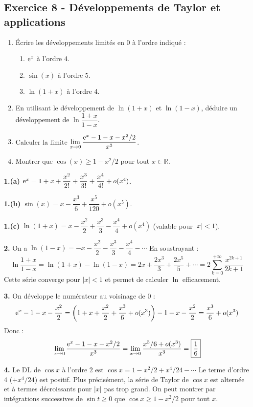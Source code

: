 \documentclass[12pt,a4paper]{article}
\begin{document}
\subsection*{Exercice 8 - Développements de Taylor et applications \niveau{\moyen}}

\begin{boiteexercice}
\begin{enumerate}
  \item Écrire les développements limités en 0 à l'ordre indiqué :
  \begin{enumerate}[label=(\alph*)]
    \item $\mathrm{e}^x$ à l'ordre 4.
    \item $\sin(x)$ à l'ordre 5.
    \item $\ln(1+x)$ à l'ordre 4.
  \end{enumerate}
  \item En utilisant le développement de $\ln(1+x)$ et $\ln(1-x)$, déduire un développement de $\ln\dfrac{1+x}{1-x}$.
  \item Calculer la limite $\displaystyle\lim_{x\to0}\frac{\mathrm{e}^x - 1 - x - x^2/2}{x^3}$.
  \item Montrer que $\cos(x) \geq 1 - x^2/2$ pour tout $x\in\mathbb{R}$.
\end{enumerate}
\end{boiteexercice}

\begin{boitecorrige}
\textbf{1.(a)} $\mathrm{e}^x = 1 + x + \dfrac{x^2}{2!} + \dfrac{x^3}{3!} + \dfrac{x^4}{4!} + o(x^4)$.

\textbf{1.(b)} $\sin(x) = x - \dfrac{x^3}{6} + \dfrac{x^5}{120} + o(x^5)$.

\textbf{1.(c)} $\ln(1+x) = x - \dfrac{x^2}{2} + \dfrac{x^3}{3} - \dfrac{x^4}{4} + o(x^4)$ (valable pour $|x| < 1$).

\textbf{2.} On a $\ln(1-x) = -x - \dfrac{x^2}{2} - \dfrac{x^3}{3} - \dfrac{x^4}{4} - \cdots$ En soustrayant :
\[
\ln\frac{1+x}{1-x} = \ln(1+x) - \ln(1-x) = 2x + \frac{2x^3}{3} + \frac{2x^5}{5} + \cdots = 2\sum_{k=0}^{+\infty}\frac{x^{2k+1}}{2k+1}
\]
Cette série converge pour $|x|<1$ et permet de calculer $\ln$ efficacement.

\textbf{3.} On développe le numérateur au voisinage de 0 :
\[
\mathrm{e}^x - 1 - x - \frac{x^2}{2} = \left(1+x+\frac{x^2}{2}+\frac{x^3}{6}+o(x^3)\right) - 1 - x - \frac{x^2}{2} = \frac{x^3}{6} + o(x^3)
\]
Donc :
\[
\lim_{x\to0}\frac{\mathrm{e}^x-1-x-x^2/2}{x^3} = \lim_{x\to0}\frac{x^3/6+o(x^3)}{x^3} = \boxed{\frac{1}{6}}
\]

\textbf{4.} Le DL de $\cos x$ à l'ordre 2 est $\cos x = 1 - x^2/2 + x^4/24 - \cdots$ Le terme d'ordre 4 ($+x^4/24$) est positif. Plus précisément, la série de Taylor de $\cos x$ est alternée et à termes décroissants pour $|x|$ pas trop grand. On peut montrer par intégrations successives de $\sin t \geq 0$ que $\cos x \geq 1 - x^2/2$ pour tout $x$.
\end{boitecorrige}
\end{document}
